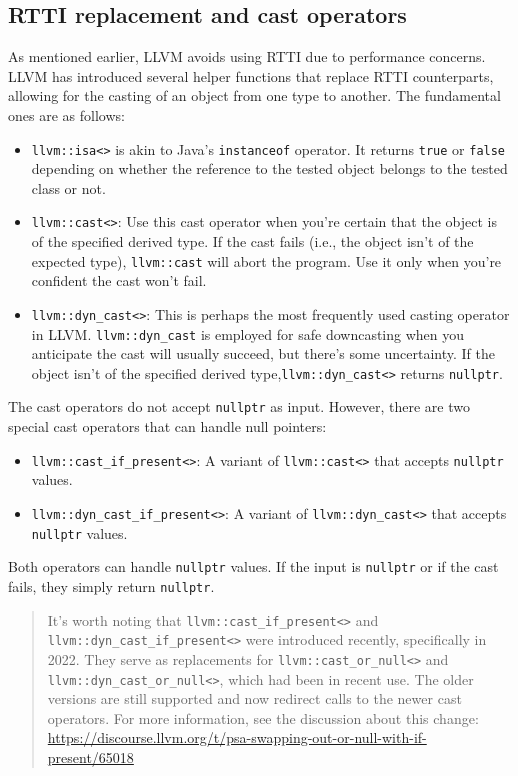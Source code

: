 \subsection{RTTI replacement and cast operators}
\label{sec:rtti:replacement}
As mentioned earlier, LLVM avoids using RTTI due to performance concerns. LLVM
has introduced several helper functions that replace RTTI counterparts, allowing
for the casting of an object from one type to another. The fundamental ones are
as follows:
\begin{itemize}
  \item \texttt{llvm::isa<>} is akin to Java's
    \texttt{instanceof} operator. It returns \texttt{true} or
    \texttt{false} depending on whether the reference to the tested
    object belongs to the tested class or not.
  \item \texttt{llvm::cast<>}: Use this cast operator when you're
    certain that the object is of the specified derived type. If the cast fails
    (i.e., the object isn't of the expected type), \texttt{llvm::cast}
    will abort the program. Use it only when you're confident the cast won't
    fail. 
  \item \texttt{llvm::dyn_cast<>}: This is perhaps the most
    frequently used casting operator in LLVM. \texttt{llvm::dyn_cast}
    is employed for safe downcasting when you anticipate the cast will usually
    succeed, but there's some uncertainty. If the object isn't of the specified
    derived type,\texttt{llvm::dyn_cast<>} returns
    \texttt{nullptr}.   
\end{itemize}
The cast operators do not accept \texttt{nullptr} as input. However,
there are two special cast operators that can handle null pointers: 
\begin{itemize}
\item \texttt{llvm::cast_if_present<>}: A variant of
  \texttt{llvm::cast<>} that accepts \texttt{nullptr} values. 
\item \texttt{llvm::dyn_cast_if_present<>}: A variant of
  \texttt{llvm::dyn_cast<>} that accepts \texttt{nullptr}
  values. 
\end{itemize}
Both operators can handle \texttt{nullptr} values. If the input is \texttt{nullptr} or if the cast fails, they simply return \texttt{nullptr}.

\begin{quote}
It's worth noting that \texttt{llvm::cast_if_present<>} and
\texttt{llvm::dyn_cast_if_present<>} were introduced recently,
specifically in 2022. They serve as replacements for
\texttt{llvm::cast_or_null<>} and
\texttt{llvm::dyn_cast_or_null<>}, which had been in recent use. The
older versions are still supported and now redirect calls to the newer cast
operators. For more information, see the discussion about this change:
\href{https://discourse.llvm.org/t/psa-swapping-out-or-null-with-if-present/65018}{https://discourse.llvm.org/t/psa-swapping-out-or-null-with-if-present/65018} 
\end{quote}

